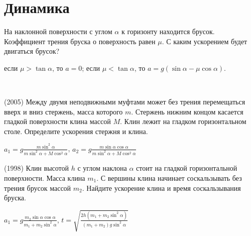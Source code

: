 \section{Динамика}
 
\begin{ex}
На наклонной поверхности с углом $\alpha$ к горизонту находится брусок. 
Коэффициент трения бруска о поверхность равен $\mu$. С каким ускорением будет двигаться брусок?
\begin{ans}
если $\mu > \tan \alpha$, то $a = 0$; если $\mu < \tan \alpha$, то $a = g(\sin \alpha - \mu \cos \alpha)$.
\end{ans}
\end{ex}

\begin{ex}
\hspace{0pt} \\
\begin{minipage}{.65\textwidth}
(2005) Между двумя неподвижными муфтами может без трения перемещаться вверх и вниз стержень, масса которого $m$. Стержень нижним концом касается гладкой поверхности клина массой $M$. Клин лежит на гладком горизонтальном столе. Определите ускорения стержня и клина.
\end{minipage}
\begin{minipage}{.35\textwidth}
\centering

\end{minipage}
\begin{ans}
$a_1 = g \frac{m \sin^2 \alpha}{m \sin^2 \alpha + M \cos^2 \alpha}$, $a_2 = g\frac{m \sin \alpha \cos \alpha}{m \sin^2 \alpha + M \cos^2 \alpha}$
\end{ans}
\end{ex}

\begin{ex}
(1998) Клин высотой $h$ с углом наклона $\alpha$ стоит на гладкой горизонтальной поверхности. Масса клина $m_1$. С вершины клина начинает соскальзывать без трения брусок массой $m_2$. Найдите ускорение клина и время соскальзывания бруска.
\begin{ans}
$a_1 = g \frac{m_2 \sin \alpha \cos \alpha}{m_1 + m_2 \sin^2 \alpha}$, $t=\sqrt{\frac{2h(m_1+m_2\sin^2\alpha)}{(m_1+m_2)g \sin^2 \alpha}}$
\end{ans}
\end{ex}

